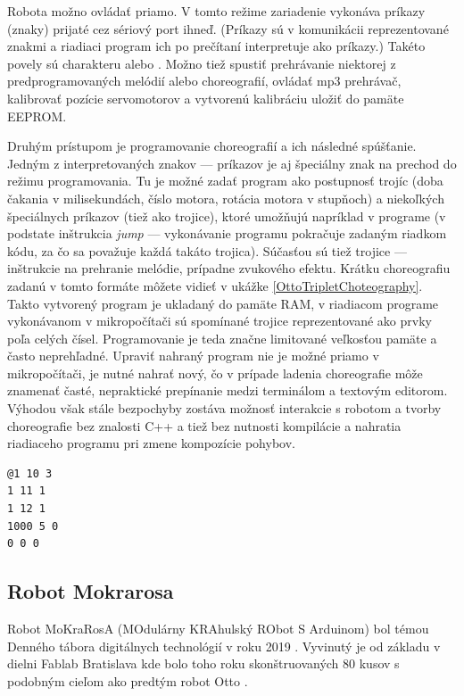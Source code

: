Robota možno ovládať priamo. V tomto režime zariadenie vykonáva príkazy (znaky) prijaté cez sériový port ihneď. (Príkazy sú v komunikácii reprezentované znakmi a riadiaci program ich po prečítaní interpretuje ako príkazy.) Takéto povely sú charakteru  alebo . Možno tiež spustiť prehrávanie niektorej z predprogramovaných melódií alebo choreografií, ovládať mp3 prehrávač, kalibrovať pozície servomotorov a vytvorenú kalibráciu uložiť do pamäte EEPROM.

Druhým prístupom je programovanie choreografií a ich následné spúšťanie. Jedným z interpretovaných znakov --- príkazov je aj špeciálny znak na prechod do režimu programovania. Tu je možné zadať program ako postupnosť trojíc (doba čakania v milisekundách, číslo motora, rotácia motora v stupňoch) a niekoľkých špeciálnych príkazov (tiež ako trojice), ktoré umožňujú napríklad  v programe (v podstate inštrukcia \textit{jump} --- vykonávanie programu pokračuje zadaným riadkom kódu, za čo sa považuje každá takáto trojica). Súčasťou sú tiež trojice --- inštrukcie na prehranie melódie, prípadne zvukového efektu. Krátku choreografiu zadanú v tomto formáte môžete vidieť v ukážke \ref{OttoTripletChoteography}. Takto vytvorený program je ukladaný do pamäte RAM, v riadiacom programe vykonávanom v mikropočítači sú spomínané trojice reprezentované ako prvky poľa celých čísel. Programovanie je teda značne limitované veľkosťou pamäte a často neprehľadné. Upraviť nahraný program nie je možné priamo v mikropočítači, je nutné nahrať nový, čo v prípade ladenia choreografie môže znamenať časté, nepraktické prepínanie medzi terminálom a textovým editorom. Výhodou však stále bezpochyby zostáva možnosť interakcie s robotom a tvorby choreografie bez znalosti C++ a tiež bez nutnosti kompilácie a nahratia riadiaceho programu pri zmene kompozície pohybov.

\vspace{2cm}

\begin{lstlisting}[frame=single]
@1 10 3
1 11 1
1 12 1
1000 5 0
0 0 0
\end{lstlisting}

\newpage

\subsection{Robot Mokrarosa}
\label{sub:mokrarosa}
Robot MoKraRosA (MOdulárny KRAhulský RObot S Arduinom) bol témou Denného tábora digitálnych technológií v roku 2019 \cite{PetrovicVaskoMokrarosa}. Vyvinutý je od základu v dielni Fablab Bratislava kde bolo toho roku skonštruovaných 80 kusov s podobným cieľom ako predtým robot Otto \cite{Mokrarosa}.

